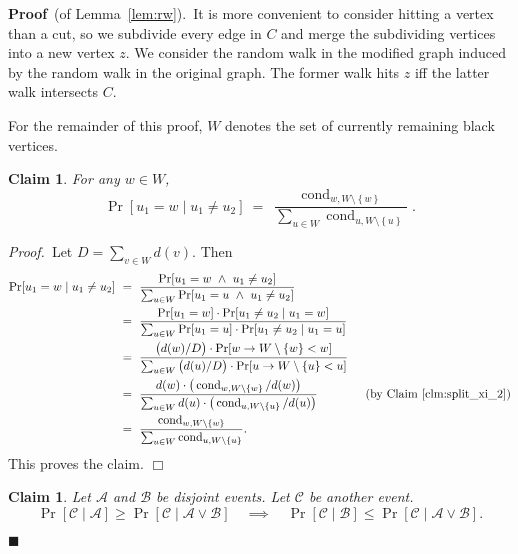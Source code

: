 \documentclass[11pt]{article}
\newcommand{\proofbelow}{8pt}
\numberwithin{equation}{section}
\newtheorem{claim}[theorem]{Claim}
\newenvironment{proofof}[1]{\noindent\textbf{Proof} \,(of #1).\,}{\afterproof}
\newenvironment{subproof}{\noindent\textit{Proof.}\,}{\aftersubproof}
\newcommand{\afterproof}{\hfill $\blacksquare$ \par \vspace{\proofbelow}}
\newcommand{\aftersubproof}{\hfill $\Box$ \par \vspace{\proofbelow}}
\newcommand{\cA}{\mathcal{A}}
\newcommand{\cB}{\mathcal{B}}
\newcommand{\cC}{\mathcal{C}}
\newcommand{\cond}{\operatorname{cond}}
\newcommand{\set}[1]{\left \{ #1 \right \}}                     \newcommand{\setst}[2]{\left\{\; #1 \,:\, #2 \;\right\}}
\newcommand{\ClaimName}[1]{\label{clm:#1}}
\newcommand{\Claim}[1]{Claim~\ref{clm:#1}}
\newcommand{\Lemma}[1]{Lemma~\ref{lem:#1}}
\begin{document}
\begin{proofof}{\Lemma{rw}}
It is more convenient to consider hitting a vertex than a cut,
so we subdivide every edge in $C$ and merge the subdividing vertices into a new vertex $z$.
We consider the random walk in the modified graph induced by the random walk in the
original graph.
The former walk hits $z$ iff the latter walk intersects $C$. 

For the remainder of this proof, $W$ denotes the set of currently remaining black vertices.

\begin{claim}
\ClaimName{uw}
For any $w \in W$,
$$
    \Pr[u_1=w \mid u_1 \neq u_2]
        ~=~ \frac{ \cond_{w,W\setminus \set{w}} }{ \sum_{u \in W} \cond_{u,W\setminus \set{u}} }.
$$
\end{claim}
\begin{subproof}
Let $D = \sum_{v \in W} d(v)$.
Then
\begin{align*}
\Pr[u_1=w \mid u_1 \neq u_2] 
&~=~ \frac{ \Pr[u_1=w ~\wedge~ u_1 \neq u_2] }
    { \sum_{u\in W} \Pr[u_1=u ~\wedge~ u_1 \neq u_2] } \\
&~=~ \frac{ \Pr[u_1=w ]
    \cdot \Pr[ u_1 \neq u_2 \mid u_1=w ] }
    { \sum_{u\in W} \Pr[u_1=u] \cdot \Pr[ u_1 \neq u_2 \mid u_1=u ] } \\
&~=~ \frac{ \big( d(w)/D \big)
    \cdot \Pr[ w \rightarrow W \setminus \{w\} < w ] }
    { \sum_{u\in W} \big( d(u)/D \big) \cdot \Pr[ u \rightarrow W \setminus \{u\} < u ] } \\
&~=~ \frac{ d(w)
    \cdot \big( \cond_{w, W \setminus \{w\}} / d(w) \big) }
    { \sum_{u\in W} d(u) \cdot \big( \cond_{u, W \setminus \{u\}} / d(u) \big) }
    \qquad\qquad\text{(by \Claim{split_xi_2})}
    \\
&~=~ \frac{ \cond_{w,W\setminus \{w\}} }
    { \sum_{u \in W} \cond_{u,W\setminus \{u\}} }.
\end{align*}
This proves the claim.
\end{subproof}

\begin{claim}
\ClaimName{given}
Let $\cA$ and $\cB$ be disjoint events. Let $\cC$ be another event.
$$
\Pr[ \cC \mid \cA ] \geq \Pr[ \cC \mid \cA \vee \cB ]
\quad\implies\quad
\Pr[ \cC \mid \cB ] \leq \Pr[ \cC \mid \cA \vee \cB ].
$$
\end{claim}


\end{proofof}
\end{document}
